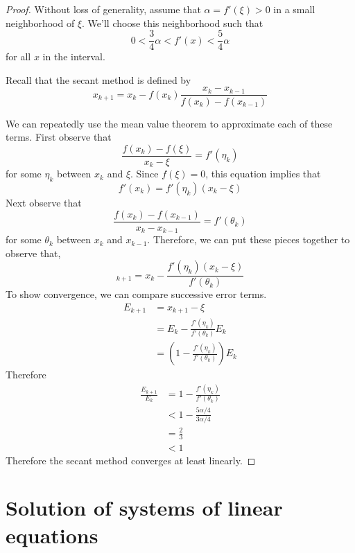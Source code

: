 \documentclass[12pt]{article}
\theoremstyle{definition}
\theoremstyle{definition}
\begin{document}
\begin{proof}
Without loss of generality, assume that $\alpha = f'(\xi) > 0$ in a small neighborhood of $\xi$. We'll choose this neighborhood such that
\begin{equation}
	0 < \frac{3}{4}\alpha < f'(x) < \frac{5}{4}\alpha
\end{equation}
for all $x$ in the interval.

Recall that the secant method is defined by 
\begin{equation}
	x_{k+1} = x_k - f(x_k) \frac{x_k - x_{k-1}}{f(x_k) - f(x_{k-1})}
\end{equation}

We can repeatedly use the mean value theorem to approximate each of these terms. First observe that
\begin{equation}
	\frac{f(x_k) - f(\xi)}{x_k - \xi} = f'(\eta_k)
\end{equation}
for some $\eta_k$ between $x_k$ and $\xi$. Since $f(\xi) = 0$, this equation implies that
\begin{equation}
	f'(x_k) = f'(\eta_k)(x_k - \xi)
\end{equation}
Next observe that
\begin{equation}
	\frac{f(x_k) - f(x_{k-1})}{x_k - x_{k-1}} = f'(\theta_k) 
\end{equation}
for some $\theta_k$ between $x_k$ and $x_{k-1}$. Therefore, we can put these pieces together to observe that,
\begin{equation}
	_{k+1} = x_k - \frac{f'(\eta_k)(x_k - \xi)}{f'(\theta_k)}
\end{equation}
To show convergence, we can compare successive error terms.
\begin{align*}
	E_{k+1} &= x_{k+1} - \xi \\
	&= E_k - \frac{f'(\eta_k)}{f'(\theta_k)}E_k  \\
	&= \left( 1 - \frac{f'(\eta_k)}{f'(\theta_k)} \right) E_k
\end{align*}
Therefore
\begin{align*}
	\frac{E_{k+1}}{E_k} &= 1 - \frac{f'(\eta_k)}{f'(\theta_k)} \\
	&< 1 - \frac{5\alpha/4}{3\alpha/4} \\
	&= \frac{2}{3} \\
	&< 1
\end{align*}	
Therefore the secant method converges at least linearly. 
\end{proof}

\section{Solution of systems of linear equations}
\end{document}
